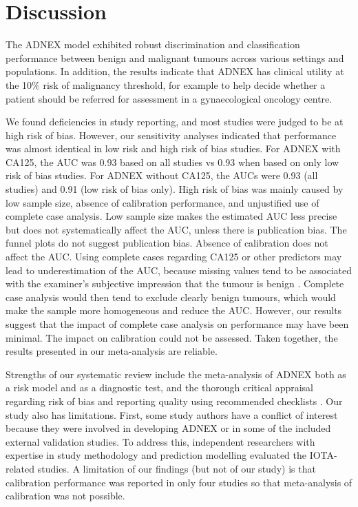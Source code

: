 \section{Discussion}

The \gls{ADNEX} model exhibited robust discrimination and classification performance
between benign and malignant tumours across various settings and populations. In
addition, the results indicate that \gls{ADNEX} has clinical utility at the 10\% risk
of malignancy threshold, for example to help decide whether a patient should be
referred for assessment in a gynaecological oncology centre.

We found deficiencies in study reporting, and most studies were judged to be at
high risk of bias. However, our sensitivity analyses indicated that performance
was almost identical in low risk and high risk of bias studies. For \gls{ADNEX} with
CA125, the \gls{AUC} was 0.93 based on all studies vs 0.93 when based on only low risk
of bias studies. For \gls{ADNEX} without CA125, the \glspl{AUC} were 0.93 (all studies) and
0.91 (low risk of bias only). High risk of bias was mainly caused by low sample
size, absence of calibration performance, and unjustified use of complete case
analysis. Low sample size makes the estimated \gls{AUC} less precise but does not
systematically affect the \gls{AUC}, unless there is publication bias. The funnel
plots do not suggest publication bias. Absence of calibration does not affect
the \gls{AUC}. Using complete cases regarding CA125 or other predictors may lead to
underestimation of the \gls{AUC}, because missing values tend to be associated with
the examiner’s subjective impression that the tumour is benign
 \cite{landolfoBenignDescriptorsADNEX2023}. Complete case analysis would then
tend to exclude clearly benign tumours, which would make the sample more
homogeneous and reduce the \gls{AUC}. However, our results suggest that the impact of
complete case analysis on performance may have been minimal. The impact on
calibration could not be assessed. Taken together, the results presented in our
meta-analysis are reliable.

Strengths of our systematic review include the meta-analysis of \gls{ADNEX} both as a
risk model and as a diagnostic test, and the thorough critical appraisal
regarding risk of bias and reporting quality using recommended checklists
 \cite{wolffPROBASTToolAssess2019,collinsTransparentReportingMultivariable2015}.
Our study also has limitations. First, some study authors have a conflict of
interest because they were involved in developing \gls{ADNEX} or in some of the
included external validation studies. To address this, independent researchers
with expertise in study methodology and prediction modelling evaluated the
\gls{IOTA}-related studies. A limitation of our findings (but not of our study) is
that calibration performance was reported in only four studies so that
meta-analysis of calibration was not possible.

